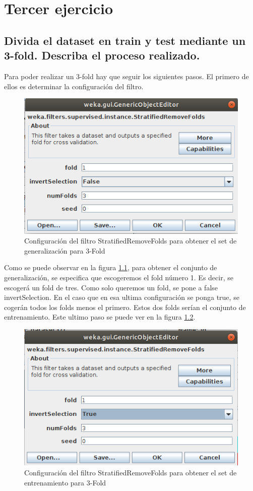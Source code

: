 \documentclass[11pt,twoside,a4paper]{book}
\begin{document}
\chapter{Tercer ejercicio}
\section{Divida el dataset en train y test mediante un 3-fold. Describa el proceso realizado.}
Para poder realizar un 3-fold hay que seguir los siguientes pasos. El primero de ellos
es determinar la configuración del filtro.

\begin{figure}[H]
	\includegraphics[width=\textwidth]{ejercicio3_1.png}
	\caption{Configuración del filtro StratifiedRemoveFolds para obtener el set de generalización para 3-Fold}
	\label{Fig13}
\end{figure}

Como se puede observar en la figura \ref{Fig13}, para obtener el conjunto de
generalización, se especifica que escogeremos el fold número 1. Es decir, se escogerá
un fold de tres. Como solo queremos un fold, se pone a false invertSelection. En el
caso que en esa ultima configuración se ponga true, se cogerán todos los folds menos el
primero. Estos dos folds serían el conjunto de entrenamiento. Este ultimo paso se puede
ver en la figura \ref{Fig14}.

\begin{figure}[H]
	\includegraphics[width=\textwidth]{ejercicio3_2.png}
	\caption{Configuración del filtro StratifiedRemoveFolds para obtener el set de entrenamiento para 3-Fold}
	\label{Fig14}
\end{figure}
\end{document}
